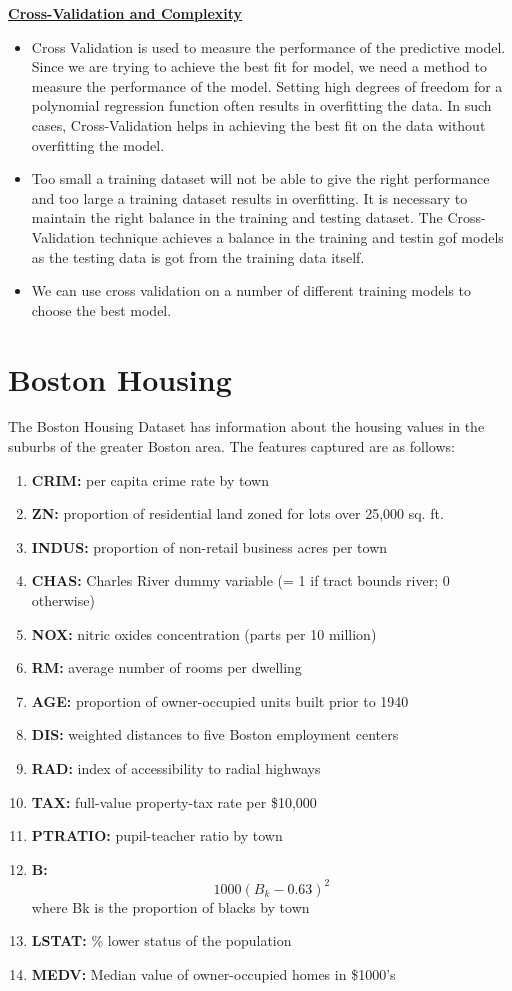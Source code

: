 \documentclass[letterpaper,twocolumn,10pt]{article}
\begin{document}
\textbf{\underline{Cross-Validation and Complexity}}\\
\begin{itemize}
\item Cross Validation is used to measure the performance of the predictive model. Since we are trying to achieve the best fit for model, we need a method to measure the performance of the model. Setting high degrees of freedom for a polynomial regression function often results in overfitting the data. In such cases, Cross-Validation helps in achieving the best fit on the data without overfitting the model.
\item Too small a training dataset will not be able to give the right performance and too large a training dataset results in overfitting. It is necessary to maintain the right balance in the training and testing dataset. The Cross-Validation technique achieves a balance in the training and testin gof models as the testing data is got from the training data itself.
\item We can use cross validation on a number of different training models to choose the best model.
 \end{itemize}
 \section{Boston Housing}
 The Boston Housing Dataset has information about the housing  values in the suburbs of the greater Boston area. The features captured are as follows:
 \begin{enumerate}
 \item \textbf{CRIM:} per capita crime rate by town
 \item \textbf{ZN:} proportion of residential land zoned for lots over 25,000 sq. ft.
\item \textbf{INDUS:} proportion of non-retail business acres per town
\item \textbf{CHAS:} Charles River dummy variable (= 1 if tract bounds river; 0 otherwise)
\item \textbf{NOX:} nitric oxides concentration (parts per 10 million)
\item \textbf{RM:} average number of rooms per dwelling
\item \textbf{AGE:} proportion of owner-occupied units built prior to 1940
\item \textbf{DIS:} weighted distances to five Boston employment centers
\item \textbf{RAD:} index of accessibility to radial highways
\item \textbf{TAX:} full-value property-tax rate per \$10,000
\item \textbf{PTRATIO:} pupil-teacher ratio by town
\item \textbf{B:} \[1000(B_k - 0.63)^2\] where Bk is the proportion of blacks by town
\item \textbf{LSTAT:} \% lower status of the population
\item \textbf{MEDV:} Median value of owner-occupied homes in \$1000’s
 \end{enumerate}
 \
\end{document}
